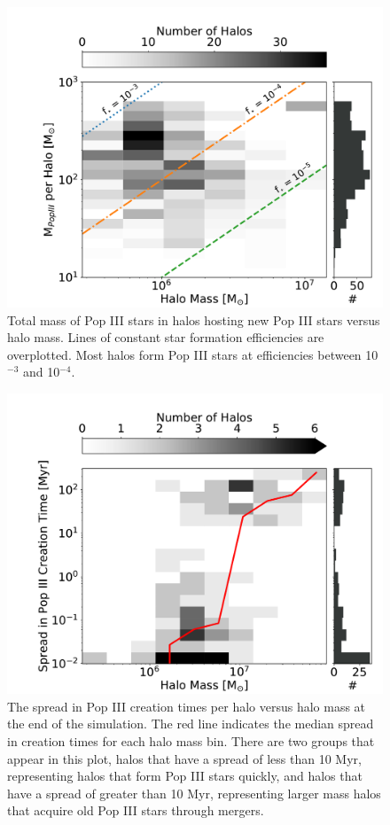 \documentclass[fleqn,usenatbib]{mnras}
\begin{document}
\begin{figure}
	\includegraphics[width=\columnwidth]{images/totp3mass_halomass_sidehist.pdf}
    \caption{Total mass of Pop III stars in halos hosting new Pop III stars versus halo mass. Lines of constant star formation efficiencies are overplotted. Most halos form Pop III stars at efficiencies between 10$^{-3}$ and 10$^{-4}$.}
    \label{fig:totp3mass_halomass_sidehist}
\end{figure}

\begin{figure}
	\includegraphics[width=\columnwidth]{images/p3spread_mass.pdf}
    \caption{The spread in Pop III creation times per halo versus halo mass at the end of the simulation. The red line indicates the median spread in creation times for each halo mass bin. There are two groups that appear in this plot, halos that have a spread of less than 10 Myr, representing halos that form Pop III stars quickly, and halos that have a spread of greater than 10 Myr, representing larger mass halos that acquire old Pop III stars through mergers.}
    \label{fig:p3spread_mass}
\end{figure}
\end{document}
